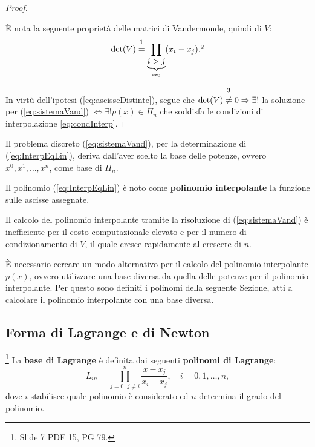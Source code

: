 \begin{proof}
    \begin{remark}
        È nota la seguente proprietà delle matrici di Vandermonde, quindi di $V$: 
        \begin{equation*}
            \det(V)\overset{\footnotemark}{=}\prod_{\underbrace{i>j}_{i\neq j}}(x_i-x_j).\footnotemark
        \end{equation*}
    \end{remark}
    
    In virtù dell'ipotesi (\ref{eq:ascisseDistinte}), segue che $\det(V)\overset{\footnotemark}{\neq} 0 \Rightarrow \exists!$ la soluzione per (\ref{eq:sistemaVand}) $\iff\exists! p(x)\in\Pi_n$ che soddisfa le condizioni di interpolazione \ref{eq:condInterp}.
\end{proof}

Il problema discreto (\ref{eq:sistemaVand}), per la determinazione di (\ref{eq:InterpEqLin}), deriva dall'aver scelto la base delle potenze, ovvero ${x^0,x^1,\hdots, x^n}$, come base di $\Pi_n$.

\begin{definition}
    Il polinomio (\ref{eq:InterpEqLin}) è noto come \textbf{polinomio interpolante} la funzione sulle ascisse assegnate.
\end{definition}

Il calcolo del polinomio interpolante tramite la risoluzione di (\ref{eq:sistemaVand}) è inefficiente per il costo computazionale elevato e per il numero di condizionamento di $V$, il quale cresce rapidamente al crescere di $n$.

È necessario cercare un modo alternativo per il calcolo del polinomio interpolante $p(x)$, ovvero utilizzare una base diversa da quella delle potenze per il polinomio interpolante. Per questo sono definiti i polinomi della seguente Sezione, atti a calcolare il polinomio interpolante con una base diversa.

\subsection{Forma di Lagrange e di Newton}
\begin{definition}\footnote{Slide 7 PDF 15, PG 79.}
    La \textbf{base di Lagrange} è definita dai seguenti \textbf{polinomi di Lagrange}:
    \begin{equation}\label{eq:polLagrange}
        L_{in}=\prod_{j=0,\,j\neq i}^{n} \frac{x-x_j}{x_i-x_j},\quad i=0,1,\hdots,n, 
    \end{equation}
    dove $i$ stabilisce quale polinomio è considerato ed $n$ determina il grado del polinomio.
\end{definition}

